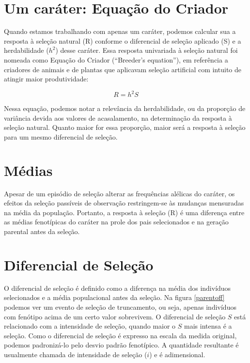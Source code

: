 \documentclass[portuges,]{tufte-handout}
\begin{document}
\section{Um caráter: Equação do
Criador}\label{um-caruxe1ter-equauxe7uxe3o-do-criador}

Quando estamos trabalhando com apenas um caráter, podemos calcular sua a
resposta à seleção natural (R) conforme o diferencial de seleção
aplicado (S) e a herdabilidade ($h^2$) desse caráter. Essa resposta
univariada à seleção natural foi nomeada como Equação do Criador
(``Breeder's equation''), em referência a criadores de animais e de
plantas que aplicavam seleção artificial com intuito de atingir maior
produtividade:

\[
R = h^2S
\]

Nessa equação, podemos notar a relevância da herdabilidade, ou da
proporção de variância devida aos valores de acasalamento, na
determinação da resposta à seleção natural. Quanto maior for essa
proporção, maior será a resposta à seleção para um mesmo diferencial de
seleção.

\section{Médias}\label{muxe9dias}

Apesar de um episódio de seleção alterar as frequências alélicas do
caráter, os efeitos da seleção passíveis de observação restringem-se às
mudanças mensuradas na média da população. Portanto, a resposta à
seleção (R) é uma diferença entre as médias fenotípicas do caráter na
prole dos pais selecionados e na geração parental antes da seleção.

\section{Diferencial de Seleção}\label{diferencial-de-seleuxe7uxe3o}

O diferencial de seleção é definido como a diferença na média dos
indivíduos selecionados e a média populacional antes da seleção. Na
figura \ref{parentoff} podemos ver um evento de seleção de truncamento,
ou seja, apenas indivíduos com fenótipo acima de um certo valor
sobrevivem. O diferencial de seleção $S$ está relacionado com a
intensidade de seleção, quando maior o $S$ mais intensa é a seleção.
Como o diferencial de seleção é expresso na escala da medida original,
podemos padronizá-lo pelo desvio padrão fenotípico. A quantidade
resultante é usualmente chamada de intensidade de seleção ($i$) e é
adimensional.
\end{document}
